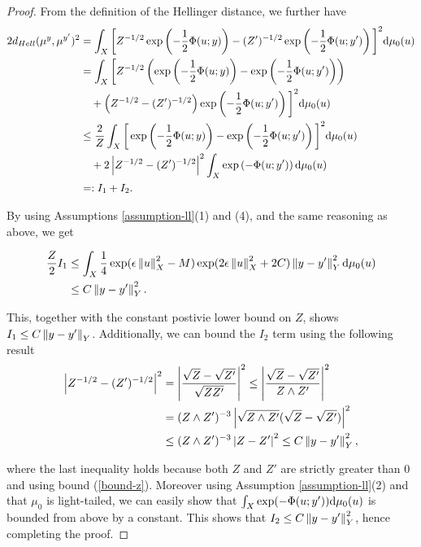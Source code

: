 \begin{proof}
  From the definition of the Hellinger distance, we further have
  \begin{align*}
    2d_{Hell}(\mu^y, \mu^{y'})^2
    &= \int_X\bigg[Z^{-1/2}\exp\left(-\frac12\Phi(u;y)\right) - (Z')^{-1/2}\exp\left(-\frac12\Phi(u; y')\right)\bigg]^2\text{d}\mu_0(u)\\
    &=\int_X\bigg[Z^{-1/2}\left(\exp\left(-\frac12\Phi(u;y)\right) - \exp\left(-\frac12\Phi(u; y')\right)\right)\\
    &\ \ \  + \left(Z^{-1/2}- (Z')^{-1/2}\right)\exp\left(-\frac12\Phi(u; y')\right)\bigg]^2\text{d}\mu_0(u)\\
    &\le \frac2Z\int_X\bigg[\exp\left(-\frac12\Phi(u;y)\right) - \exp\left(-\frac12\Phi(u; y')\right)\bigg]^2\text{d}\mu_0(u)\\
    &\ \ \ + 2\left|Z^{-1/2} - (Z')^{-1/2}\right|^2\int_X\exp\left(-\Phi(u; y')\right)\text{d}\mu_0(u)\\
    &=: I_1 + I_2.
  \end{align*}
  
  By using Assumptions \ref{assumption-ll}(1) and (4), and the same reasoning as above, we get

  \begin{equation*}
    \begin{aligned}
      \frac{Z}2I_1 &\le \int_X\frac14\exp(\epsilon\left\lVert u\right\rVert_X^2 - M)\exp(2\epsilon\left\lVert u\right\rVert_X^2 + 2C)\left\lVert y - y'\right\rVert_Y^2 \text{d}\mu_0(u)\\
        & \le C\left\lVert y - y'\right\rVert_Y^2.
    \end{aligned}
  \end{equation*}

  This, together with the constant postivie lower bound on $Z$, shows $I_1 \le C\left\lVert y - y'\right\rVert_Y$. Additionally, we can bound the $I_2$ term using the following result
  \begin{align*}
    \left|Z^{-1/2} - (Z')^{-1/2}\right|^2
    &= \left|\frac{\sqrt{Z} - \sqrt{Z'}}{\sqrt{ZZ'}}\right|^2 \leq \left|\frac{\sqrt{Z} - \sqrt{Z'}}{Z \land Z'}\right|^2 \\
    &= (Z \land Z')^{-3}\left|\sqrt{Z \land Z'}(\sqrt{Z} - \sqrt{Z'})\right|^2\\
    &\le (Z \land Z')^{-3}\left|Z - Z'\right|^2 \le C\left\lVert y - y'\right\rVert_Y^2,
  \end{align*}

  where the last inequality holds because both $Z$ and $Z'$ are strictly greater than $0$ and using bound (\ref{bound-z}). Moreover using Assumption \ref{assumption-ll}(2) and that $\mu_0$ is light-tailed, we can easily show that $\int_X\exp(-\Phi(u; y'))\text{d}\mu_0(u)$ is bounded from above by a constant. This shows that $I_2 \le C\left\lVert y - y'\right\rVert_Y^2$, hence completing the proof.
\end{proof}

